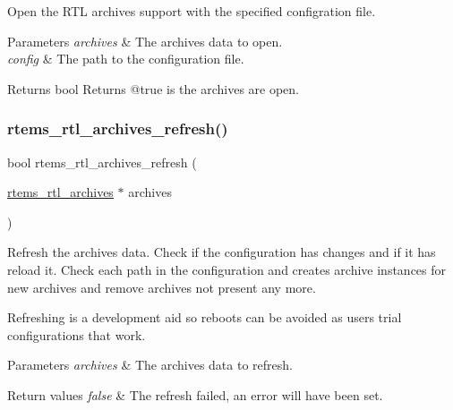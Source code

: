 Open the R\+TL archives support with the specified configration file.


\begin{DoxyParams}{Parameters}
{\em archives} & The archives data to open. \\
\hline
{\em config} & The path to the configuration file. \\
\hline
\end{DoxyParams}
\begin{DoxyReturn}{Returns}
bool Returns @true is the archives are open. 
\end{DoxyReturn}
\mbox{\label{rtl-archive_8c_ad357ba19c50eb2c554a8ef8bbd1baa74}} 
\subsubsection{\texorpdfstring{rtems\_rtl\_archives\_refresh()}{rtems\_rtl\_archives\_refresh()}}
{\footnotesize\ttfamily bool rtems\+\_\+rtl\+\_\+archives\+\_\+refresh (\begin{DoxyParamCaption}\item[{\mbox{\hyperlink{structrtems__rtl__archives}{rtems\+\_\+rtl\+\_\+archives}} $\ast$}]{archives }\end{DoxyParamCaption})}

Refresh the archives data. Check if the configuration has changes and if it has reload it. Check each path in the configuration and creates archive instances for new archives and remove archives not present any more.

Refreshing is a development aid so reboots can be avoided as users trial configurations that work.


\begin{DoxyParams}{Parameters}
{\em archives} & The archives data to refresh. \\
\hline
\end{DoxyParams}

\begin{DoxyRetVals}{Return values}
{\em false} & The refresh failed, an error will have been set. \\
\hline
\end{DoxyRetVals}
\mbox{\label{rtl-archive_8c_a227474f93062e44724c06cb229de6142}} 
